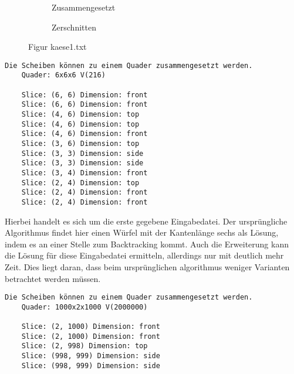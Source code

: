 \documentclass[a4paper,10pt,ngerman]{scrartcl}
\newcommand{\simplecube}[8]%
{
    \begin{scope}[shift={#1}]
        \fill[gray!40,canvas is yz plane at x=#2, opacity=#8] (0,0) rectangle (#3,#4);
        \fill[gray!10,canvas is xz plane at y=#3, opacity=#8] (0,0) rectangle (#2,#4);
        \fill[white  ,canvas is xy plane at z=#4, opacity=#8] (0,0) rectangle (#2,#3);
        \foreach\i/\j in {0/1, 1/1, 1/0}
            {
            \draw[line#5] (0,#3*\i,#4*\j) --++ (#2,0,0);
            \draw[line#6] (#2*\i,0,#4*\j) --++ (0,#3,0);
            \draw[line#7] (#2*\i,#3*\j,0) --++ (0,0,#4);
        }
    \end{scope}
}
\newcommand{\bigSquare}[4]%
{
    \begin{scope}[shift={#1}]
        \simplecube{(0,     0,      0)}     {1}{4}{2}   {a}{a}{a}   {1}
        \simplecube{(1+#4,   0,      0))}    {1}{4}{2}   {a}{a}{a}   {1}
        \simplecube{(0,     0,      2+#4)}   {2}{4}{1}   {a}{a}{a}   {1}
        \simplecube{(2+2*#4,   0,      0)}     {1}{4}{3}   {a}{a}{a}   {0.8}
        \simplecube{(0,     4+#4,    0)}     {3}{1}{3}   {a}{a}{a}   {0.8}
        \simplecube{(0,     5+2*#4,    0)}     {3}{1}{3}   {a}{a}{a}   {0.5}
        \simplecube{(0,     0,      3+2*#4)}   {3}{6}{1}   {a}{a}{a}   {0.8}
        \simplecube{(3+3*#4,   0,      0))}    {1}{6}{4}   {a}{a}{a}   {0.5}
        \simplecube{(0,     0,      4+3*#4)}   {4}{6}{1}   {a}{a}{a}   {0.5}
        \simplecube{(0,     0,      5+4*#4)}   {4}{6}{1}   {a}{a}{a}   {0.2}
        \simplecube{(4+4*#4,   0,      0))}    {1}{6}{6}   {a}{a}{a}   {0.2}
        \simplecube{(5+5*#4,   0,      0))}    {1}{6}{6}   {a}{a}{a}   {0}
    \end{scope}
}
\begin{document}
    \begin{figure}[H]
        \centering
        \def\a{3.2}
        \def\b{1.2}
        \begin{subfigure}[b]{0.45\textwidth}
            \centering %
            \caption{Zusammengesetzt}\label{fig:figA1}
        \end{subfigure}
        \begin{subfigure}[b]{0.45\textwidth}
            \centering %
            \caption{Zerschnitten}\label{fig:figB1}
        \end{subfigure}
        \caption{Figur kaese1.txt}\label{fig:figAB1}
    \end{figure}

    \newpage
    \begin{lstlisting}[frame=single, title=Programmausgabe kaese1.txt, breaklines=true,label={lst:lstlisting6}]
    Die Scheiben können zu einem Quader zusammengesetzt werden.
    Quader: 6x6x6 V(216)

    Slice: (6, 6) Dimension: front
    Slice: (6, 6) Dimension: front
    Slice: (4, 6) Dimension: top
    Slice: (4, 6) Dimension: top
    Slice: (4, 6) Dimension: front
    Slice: (3, 6) Dimension: top
    Slice: (3, 3) Dimension: side
    Slice: (3, 3) Dimension: side
    Slice: (3, 4) Dimension: front
    Slice: (2, 4) Dimension: top
    Slice: (2, 4) Dimension: front
    Slice: (2, 4) Dimension: front
    \end{lstlisting}

    Hierbei handelt es sich um die erste gegebene Eingabedatei.
    Der ursprüngliche Algorithmus findet hier einen Würfel mit der Kantenlänge sechs als Lösung, indem es an einer Stelle zum Backtracking kommt.
    Auch die Erweiterung kann die Lösung für diese Eingabedatei ermitteln, allerdings nur mit deutlich mehr Zeit.
    Dies liegt daran, dass beim ursprünglichen algorithmus weniger Varianten betrachtet werden müssen.

    \begin{lstlisting}[frame=single, title=Programmausgabe kaese2.txt, breaklines=true,label={lst:lstlisting7}]
    Die Scheiben können zu einem Quader zusammengesetzt werden.
    Quader: 1000x2x1000 V(2000000)

    Slice: (2, 1000) Dimension: front
    Slice: (2, 1000) Dimension: front
    Slice: (2, 998) Dimension: top
    Slice: (998, 999) Dimension: side
    Slice: (998, 999) Dimension: side
    \end{lstlisting}
\end{document}
